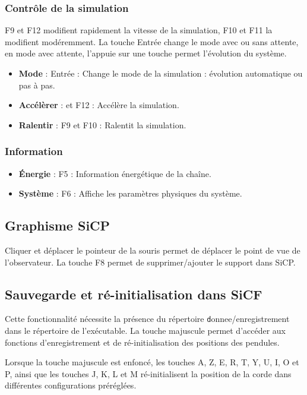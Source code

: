 \subsubsection{Contrôle de la simulation}
%
{\sf F9} et {\sf F12} modifient rapidement la vitesse de la simulation, {\sf F10} et {\sf F11} la modifient modéremment. La touche {\sf Entrée} change le mode avec ou sans attente, en mode avec attente, l'appuie sur une touche permet l'évolution du système.
%
\begin{itemize}[label=, leftmargin=2cm, itemsep=0pt]
\item {\bf Mode} : {\sf Entrée} : Change le mode de la simulation : évolution automatique ou pas à pas.
\item {\bf Accélèrer} : {} et {\sf F12} : Accélère la simulation.
\item {\bf Ralentir} : {\sf F9} et {\sf F10} : Ralentit la simulation.
\end{itemize}
%
%
\subsubsection{Information}
\begin{itemize}[label=, leftmargin=2cm, itemsep=0pt]
\item {\bf Énergie} : {\sf F5} : Information énergétique de la chaîne.
\item {\bf Système} : {\sf F6} : Affiche les paramètres physiques du système.
\end{itemize}
%
\subsection{Graphisme SiCP}
Cliquer et déplacer le pointeur de la souris permet de déplacer le point de vue de l'observateur. La touche {\sf F8} permet de supprimer/ajouter le support dans SiCP.
%
\subsection{Sauvegarde et ré-initialisation dans SiCF}
%
Cette fonctionnalité nécessite la présence du répertoire {\texttt donnee/enregistrement} dans le répertoire de l'exécutable.
La touche majuscule permet d'accéder aux fonctions d'enregistrement et de ré-initialisation des positions des pendules.

Lorsque la touche majuscule est enfoncé, les touches {\sf A}, {\sf Z}, {\sf E}, {\sf R}, {\sf T}, {\sf Y}, {\sf U}, {\sf I}, {\sf O} et {\sf P}, ainsi que les touches {\sf J}, {\sf K}, {\sf L} et {\sf M} ré-initialisent la position de la corde dans différentes configurations préréglées.

